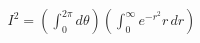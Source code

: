 \documentclass[preview]{standalone}
\begin{document}
\begin{align*}
I^2 = \left(\int_0^{2\pi} d\theta\right)\left(\int_0^\infty e^{-r^2}r\,dr\right)
\end{align*}
\end{document}
